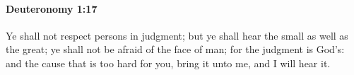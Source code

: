 
		\paragraph{Deuteronomy 1:17} %
			\label{DEUTERONOMY-1-17}

			Ye shall not respect persons in judgment; but ye shall hear the small as well as the great; ye shall not be afraid of the face of man; for the judgment is God's: and the cause that is too hard for you, bring it unto me, and I will hear it.



